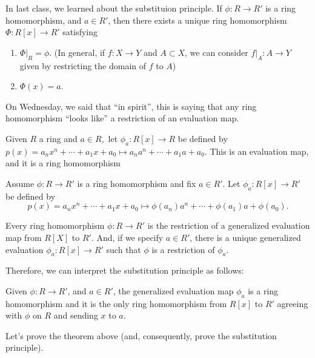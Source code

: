 
In last class, we learned about the substituion principle. If $\phi : R \to R'$ is a ring homomorphism, and $a \in R'$, then there exists a unique ring homomorphism  $\Phi : R[x] \to R'$ satisfying
\begin{enumerate}
	\item $\Phi|_R = \phi$. (In general, if $f : X \to Y$ and $A \subset X$, we can consider $f|_A : A \to Y$ given by restricting the domain of $f$ to $A$) 
	\item $\Phi(x) = a$.
\end{enumerate}

On Wednesday, we said that ``in spirit'', this is saying that any ring homomorphism ``looks like'' a restriction of an evaluation map.

\begin{exmp}
	Given $R$ a ring and $a \in R,$ let  $\phi_a: R[x] \to R$ be defined by $p(x) = a_nx^n + \cdots + a_1x + a_0 \mapsto a_na^n + \cdots + a_1 a + a_0$. This is an evaluation map, and it is a ring homomorphism
\end{exmp}

\begin{defn}	
	Assume $\phi: R \to R'$ is a ring homomorphism and fix $a \in R'$. Let $\phi_a: R[x] \to R'$ be defined by
	\[p(x) = a_n x^n + \cdots + a_1x + a_0 \mapsto \phi(a_n)a^n + \cdots + \phi(a_1)a + \phi(a_0).\]
\end{defn}

	Every ring homomorphism $\phi: R \to R'$ is the restriction of a generalized evaluation map from $R[X]$ to $R'$. And, if we specify  $a \in R'$, there is a unique generalized evaluation $\phi_a : R[x] \to R'$ such that $\phi$ is a restriction of $\phi_a$.

Therefore, we can interpret the substitution principle as follows:

\begin{thm}
Given $\phi : R \to R'$, and  $a \in R'$, the generalized evaluation map $\phi_a$ is a ring homomorphism and it is the only ring homomorphism from  $R[x]$ to  $R'$ agreeing with  $\phi $ on $R$ and sending $x$ to $a$.
\end{thm}

Let's prove the theorem above (and, consequently, prove the substitution principle).


